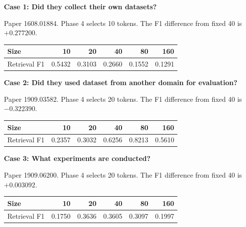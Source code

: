 \par\medskip\noindent\begin{minipage}{\textwidth}
\textbf{Case 1: Did they collect their own datasets?}\par\smallskip
Paper 1608.01884. Phase 4 selects 10 tokens. The F1 difference from fixed 40 is $+0.277200$.
\begin{center}\small\begin{tabular}{@{}lrrrrr@{}}\toprule
Size & 10 & 20 & 40 & 80 & 160\\\midrule
Retrieval F1 & 0.5432 & 0.3103 & 0.2660 & 0.1552 & 0.1291\\
\bottomrule\end{tabular}\end{center}
\end{minipage}\par\medskip

\par\medskip\noindent\begin{minipage}{\textwidth}
\textbf{Case 2: Did they used dataset from another domain for evaluation?}\par\smallskip
Paper 1909.03582. Phase 4 selects 20 tokens. The F1 difference from fixed 40 is $-0.322390$.
\begin{center}\small\begin{tabular}{@{}lrrrrr@{}}\toprule
Size & 10 & 20 & 40 & 80 & 160\\\midrule
Retrieval F1 & 0.2357 & 0.3032 & 0.6256 & 0.8213 & 0.5610\\
\bottomrule\end{tabular}\end{center}
\end{minipage}\par\medskip

\par\medskip\noindent\begin{minipage}{\textwidth}
\textbf{Case 3: What experiments are conducted?}\par\smallskip
Paper 1909.06200. Phase 4 selects 20 tokens. The F1 difference from fixed 40 is $+0.003092$.
\begin{center}\small\begin{tabular}{@{}lrrrrr@{}}\toprule
Size & 10 & 20 & 40 & 80 & 160\\\midrule
Retrieval F1 & 0.1750 & 0.3636 & 0.3605 & 0.3097 & 0.1997\\
\bottomrule\end{tabular}\end{center}
\end{minipage}\par\medskip
